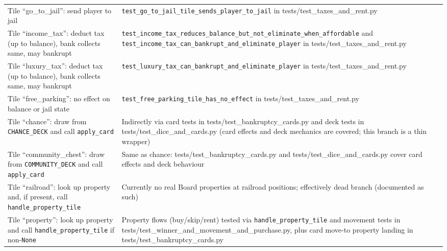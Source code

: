 \documentclass[11pt]{article}
\begin{document}
\begin{longtable}{>{\raggedright\arraybackslash}p{} >{\raggedright\arraybackslash}p{}}
\multicolumn{2}{l}{\textbf{moneypoly.game: \_move\_and\_resolve}} \\ \hline
Tile ``go\_to\_jail'': send player to jail & \texttt{test\_go\_to\_jail\_tile\_sends\_player\_to\_jail} in tests/test\_taxes\_and\_rent.py \\ \hline
Tile ``income\_tax'': deduct tax (up to balance), bank collects same, may bankrupt & \texttt{test\_income\_tax\_reduces\_balance\_but\_not\_eliminate\_when\_affordable} and \texttt{test\_income\_tax\_can\_bankrupt\_and\_eliminate\_player} in tests/test\_taxes\_and\_rent.py \\ \hline
Tile ``luxury\_tax'': deduct tax (up to balance), bank collects same, may bankrupt & \texttt{test\_luxury\_tax\_can\_bankrupt\_and\_eliminate\_player} in tests/test\_taxes\_and\_rent.py \\ \hline
Tile ``free\_parking'': no effect on balance or jail state & \texttt{test\_free\_parking\_tile\_has\_no\_effect} in tests/test\_taxes\_and\_rent.py \\ \hline
Tile ``chance'': draw from \texttt{CHANCE\_DECK} and call \texttt{apply\_card} & Indirectly via card tests in tests/test\_bankruptcy\_cards.py and deck tests in tests/test\_dice\_and\_cards.py (card effects and deck mechanics are covered; this branch is a thin wrapper) \\ \hline
Tile ``community\_chest'': draw from \texttt{COMMUNITY\_DECK} and call \texttt{apply\_card} & Same as chance: tests/test\_bankruptcy\_cards.py and tests/test\_dice\_and\_cards.py cover card effects and deck behaviour \\ \hline
Tile ``railroad'': look up property and, if present, call \texttt{handle\_property\_tile} & Currently no real Board properties at railroad positions; effectively dead branch (documented as such) \\ \hline
Tile ``property'': look up property and call \texttt{handle\_property\_tile} if non-\texttt{None} & Property flows (buy/skip/rent) tested via \texttt{handle\_property\_tile} and movement tests in tests/test\_winner\_and\_movement\_and\_purchase.py, plus card move-to property landing in tests/test\_bankruptcy\_cards.py \\ \hline


\end{longtable}
\end{document}
